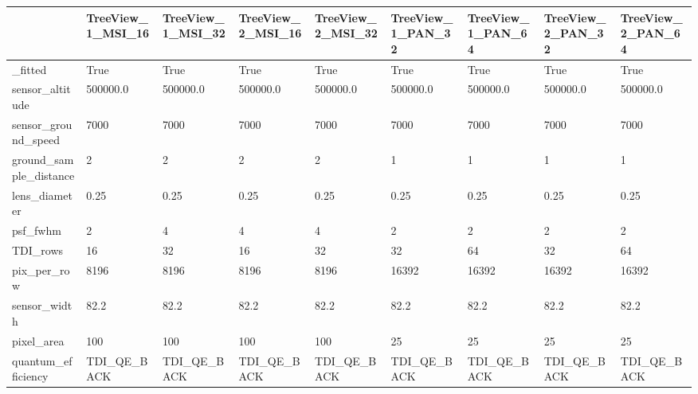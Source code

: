 \begin{tabular}{lllllllll}
\toprule
{} & TreeView\_1\_MSI\_16 & TreeView\_1\_MSI\_32 & TreeView\_2\_MSI\_16 & TreeView\_2\_MSI\_32 & TreeView\_1\_PAN\_32 & TreeView\_1\_PAN\_64 & TreeView\_2\_PAN\_32 & TreeView\_2\_PAN\_64 \\
\midrule
\_fitted                &              True &              True &              True &              True &              True &              True &              True &              True \\
sensor\_altitude        &          500000.0 &          500000.0 &          500000.0 &          500000.0 &          500000.0 &          500000.0 &          500000.0 &          500000.0 \\
sensor\_ground\_speed    &              7000 &              7000 &              7000 &              7000 &              7000 &              7000 &              7000 &              7000 \\
ground\_sample\_distance &                 2 &                 2 &                 2 &                 2 &                 1 &                 1 &                 1 &                 1 \\
lens\_diameter          &              0.25 &              0.25 &              0.25 &              0.25 &              0.25 &              0.25 &              0.25 &              0.25 \\
psf\_fwhm               &                 2 &                 4 &                 4 &                 4 &                 2 &                 2 &                 2 &                 2 \\
TDI\_rows               &                16 &                32 &                16 &                32 &                32 &                64 &                32 &                64 \\
pix\_per\_row            &              8196 &              8196 &              8196 &              8196 &             16392 &             16392 &             16392 &             16392 \\
sensor\_width           &              82.2 &              82.2 &              82.2 &              82.2 &              82.2 &              82.2 &              82.2 &              82.2 \\
pixel\_area             &               100 &               100 &               100 &               100 &                25 &                25 &                25 &                25 \\
quantum\_efficiency     &       TDI\_QE\_BACK &       TDI\_QE\_BACK &       TDI\_QE\_BACK &       TDI\_QE\_BACK &       TDI\_QE\_BACK &       TDI\_QE\_BACK &       TDI\_QE\_BACK &       TDI\_QE\_BACK \\

\end{tabular}
